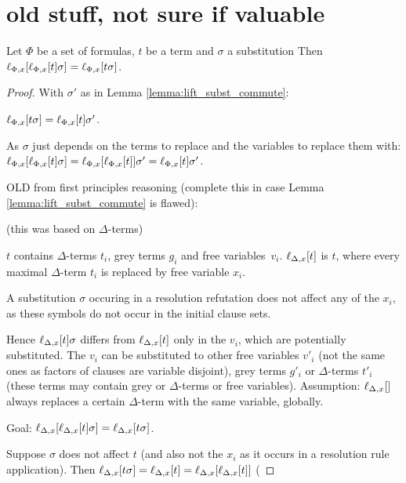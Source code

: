 \documentclass[,%
	paper=a4,%
	DIV20, 
	liststotoc,
	bibtotoc,
	draft=false,%
	numbers=noendperiod
]{scrartcl}
\begin{document}
\clearpage
\section{old stuff, not sure if valuable}

\begin{lemma}
  Let $\Phi$ be a set of formulas, $t$ be a term and $\sigma$ a substitution
  Then
  $\ell_{\Phi,x}[\ell_{\Phi,x}[t] \sigma] = \ell_{\Phi,x}[t\sigma]$.
  \label{lemma:lift_multiple_times}
\end{lemma}
\begin{proof}

  With $\sigma'$ as in Lemma \ref{lemma:lift_subst_commute}:

  $\ell_{\Phi,x}[t\sigma] = \ell_{\Phi,x}[t]\sigma'$.

  As $\sigma$ just depends on the terms to replace and the variables to replace them with:
  \newline
  $\ell_{\Phi,x}[\ell_{\Phi,x}[t]\sigma] = \ell_{\Phi,x}[\ell_{\Phi,x}[t]]\sigma' = \ell_{\Phi,x}[t]\sigma' $. \qedhere

  OLD from first principles reasoning (complete this in case Lemma \ref{lemma:lift_subst_commute}{} is flawed):

  {

    \tiny

    (this was based on $\Delta$-terms)

  $t$ contains $\Delta$-terms $t_i$, grey terms $g_i$ and free variables~$v_i$.
  $\ell_{\Delta,x}[t]$ is $t$, where every maximal $\Delta$-term $t_i$ is replaced by free variable $x_i$.

  A substitution $\sigma$ occuring in a resolution refutation does not affect any of the $x_i$, as these symbols do not occur   in the initial clause sets.

  Hence $\ell_{\Delta,x}[t] \sigma $ differs from $\ell_{\Delta,x}[t]$ only in the $v_i$, which are potentially substituted.
  The $v_i$ can be substituted to other free variables $v'_i$ (not the same ones as factors of clauses are variable disjoint),  grey terms $g'_i$ or $\Delta$-terms $t'_i$ (these terms may contain grey or $\Delta$-terms or free variables).
 Assumption: $\lifdelta$ always replaces a certain $\Delta$-term with the same variable, globally.

  Goal: $\ell_{\Delta,x}[\ell_{\Delta,x}[t] \sigma] = \ell_{\Delta,x}[t\sigma]$.

  Suppose $\sigma$ does not affect $t$ (and also not the $x_i$ as it occurs in a resolution rule application).
  Then $\ell_{\Delta,x}[t\sigma] = \ell_{\Delta,x}[t] = \ell_{\Delta,x}[\ell_{\Delta,x}[t]]$ (

}
\end{proof}
\end{document}
